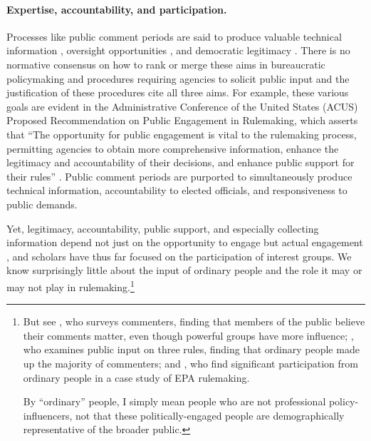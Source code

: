 \paragraph{Expertise, accountability, and participation.} %
Processes like public comment periods are said to produce valuable technical information \citep{Yackee2006JPART, Nelson2012}, oversight opportunities \citep{Balla1998, Mccubbins1984}, and democratic legitimacy \citep{Croley2003, Rosenbloom2003}. There is no normative consensus on how to rank or merge these aims \citep{Wilson1967, Wilson1989, Carrigan2017} in bureaucratic policymaking and procedures requiring agencies to solicit public input and the justification of these procedures cite all three aims. For example, these various goals are evident in the Administrative Conference of the United States (ACUS) Proposed Recommendation on Public Engagement in Rulemaking, which asserts that ``The opportunity for public engagement is vital to the rulemaking process, permitting agencies to obtain more comprehensive information, enhance the legitimacy and accountability of their decisions, and enhance public support for their rules'' \citep{ACUS2018}. Public comment periods are purported to simultaneously produce technical information, accountability to elected officials, and responsiveness to public demands.

Yet, legitimacy, accountability, public support, and especially collecting information depend not just on the opportunity to engage but actual engagement \citep{Herz2018}, and scholars have thus far focused on the participation of interest groups. We know surprisingly little about the input of ordinary people and the role it may or may not play in rulemaking.\footnote{ 
But see \citet{Yackee2015JPART}, who surveys commenters, finding that members of the public believe their comments matter, even though powerful groups have more influence; \citet{Cuellar2005}, who examines public input on three rules, finding that ordinary people made up the majority of commenters; and \citet{Balla2018}, who find significant participation from ordinary people in a case study of EPA rulemaking. 

By ``ordinary'' people, I simply mean people who are not professional policy-influencers, not that these politically-engaged people are demographically representative of the broader public.}


